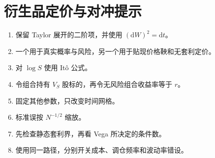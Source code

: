 \chapter{衍生品定价与对冲提示}
\begin{enumerate}[leftmargin=*]
  \item 保留 Taylor 展开的二阶项，并使用 $(\mathrm dW)^2=\mathrm dt$。
  \item 一个用于真实概率与风险，另一个用于贴现价格鞅和无套利定价。
  \item 对 $\log S$ 使用 Itô 公式。
  \item 令组合持有 $V_S$ 股标的，再令无风险组合收益率等于 $r$。
  \item 固定其他参数，只改变时间网格。
  \item 标准误按 $N^{-1/2}$ 缩放。
  \item 先检查静态套利界，再看 Vega 所决定的条件数。
  \item 使用同一路径，分别开关成本、调仓频率和波动率错设。
\end{enumerate}
